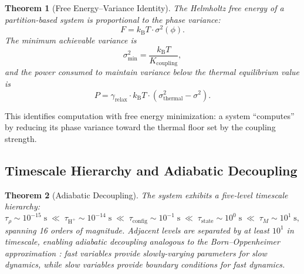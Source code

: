 \documentclass[twocolumn,10pt]{article}
\newtheorem{theorem}{Theorem}[section]
\newcommand{\kB}{k_{\mathrm{B}}}
\newcommand{\Hplus}{\mathrm{H}^{+}}
\begin{document}
\begin{theorem}[Free Energy--Variance Identity]
\label{thm:variance}
The Helmholtz free energy of a partition-based system is proportional to the phase variance:
\begin{equation}
  F = \kB T \cdot \sigma^{2}(\phi).
  \label{eq:free_energy_variance}
\end{equation}
The minimum achievable variance is
\begin{equation}
  \sigma^{2}_{\min} = \frac{\kB T}{K_{\mathrm{coupling}}},
  \label{eq:sigma_min}
\end{equation}
and the power consumed to maintain variance below the thermal equilibrium value is
\begin{equation}
  P = \gamma_{\mathrm{relax}} \cdot \kB T \cdot (\sigma^{2}_{\mathrm{thermal}} - \sigma^{2}).
  \label{eq:power}
\end{equation}
\end{theorem}

This identifies computation with free energy minimization: a system ``computes'' by reducing its phase variance toward the thermal floor set by the coupling strength.

\subsection{Timescale Hierarchy and Adiabatic Decoupling}

\begin{theorem}[Adiabatic Decoupling]
\label{thm:adiabatic}
The system exhibits a five-level timescale hierarchy:
\begin{equation}
  \tau_{\rho} \sim 10^{-15}\;\mathrm{s} \;\ll\; \tau_{\Hplus} \sim 10^{-14}\;\mathrm{s} \;\ll\; \tau_{\mathrm{config}} \sim 10^{-1}\;\mathrm{s} \;\ll\; \tau_{\mathrm{state}} \sim 10^{0}\;\mathrm{s} \;\ll\; \tau_{M} \sim 10^{1}\;\mathrm{s},
  \label{eq:timescale}
\end{equation}
spanning 16 orders of magnitude.  Adjacent levels are separated by at least $10^{1}$ in timescale, enabling adiabatic decoupling analogous to the Born--Oppenheimer approximation \citep{born1927quantentheorie}: fast variables provide slowly-varying parameters for slow dynamics, while slow variables provide boundary conditions for fast dynamics.
\end{theorem}
\end{document}
